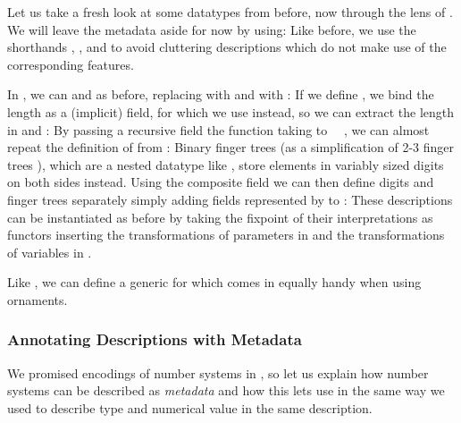 Let us take a fresh look at some datatypes from before, now through the lens of . We will leave the metadata aside for now by using:
Like before, we use the shorthands , , and  to avoid cluttering descriptions which do not make use of the corresponding features. 

In , we can \bN{} and  as before, replacing  with  and  with :
If we define , we bind the length as a (implicit) field, for which we use  instead, so we can extract the length  in  and :
By passing a recursive field  the function taking  to \ \ , we can almost repeat the definition of  from :
Binary finger trees (as a simplification of 2-3 finger trees \cite{fingertrees}), which are a nested datatype like , store elements in variably sized digits on both sides instead. Using the composite field  we can then define digits and finger trees separately
simply adding fields represented by  to :
These descriptions can be instantiated as before by taking the fixpoint
of their interpretations as functors
inserting the transformations of parameters  in  and the transformations of variables  in .

Like , we can define a generic  for 
which comes in equally handy when using ornaments.

\subsubsection{Annotating Descriptions with Metadata}
We promised encodings of number systems in , so let us explain how number systems can be described as \emph{metadata} and how this lets use  in the same way we used  to describe type and numerical value in the same description.

